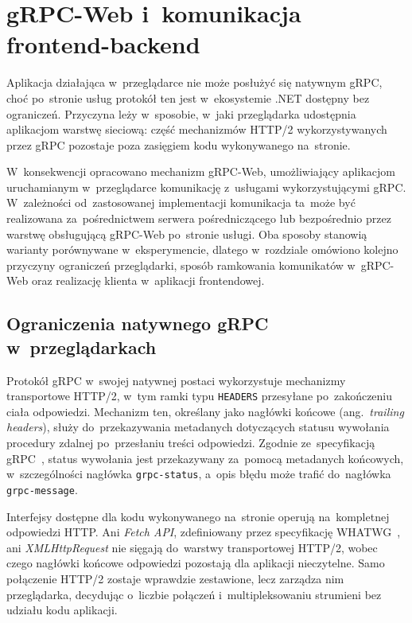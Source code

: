 \cleardoublepage

\chapter{gRPC-Web i~komunikacja frontend-backend}

\label{cha:gRPCWeb}

Aplikacja działająca w~przeglądarce nie może posłużyć się natywnym gRPC, choć po~stronie usług protokół ten jest w~ekosystemie .NET dostępny bez ograniczeń. Przyczyna leży w~sposobie, w~jaki przeglądarka udostępnia aplikacjom warstwę sieciową: część mechanizmów HTTP/2 wykorzystywanych przez gRPC pozostaje poza zasięgiem kodu wykonywanego na~stronie.

W~konsekwencji opracowano mechanizm gRPC-Web, umożliwiający aplikacjom uruchamianym w~przeglądarce komunikację z~usługami wykorzystującymi gRPC. W~zależności od~zastosowanej implementacji komunikacja ta~może być realizowana za~pośrednictwem serwera pośredniczącego lub bezpośrednio przez warstwę obsługującą gRPC-Web po~stronie usługi. Oba sposoby stanowią warianty porównywane w~eksperymencie, dlatego w~rozdziale omówiono kolejno przyczyny ograniczeń przeglądarki, sposób ramkowania komunikatów w~gRPC-Web oraz realizację klienta w~aplikacji frontendowej.


\section{Ograniczenia natywnego gRPC w~przeglądarkach}

\label{sec:OgraniczeniagRPC}


Protokół gRPC w~swojej natywnej postaci wykorzystuje mechanizmy transportowe HTTP/2, w~tym ramki typu \texttt{HEADERS} przesyłane po~zakończeniu ciała odpowiedzi. Mechanizm ten, określany jako nagłówki końcowe (ang.\ \textit{trailing headers}), służy do~przekazywania metadanych dotyczących statusu wywołania procedury zdalnej po~przesłaniu treści odpowiedzi. Zgodnie ze~specyfikacją gRPC~\cite{bib:gRPCDocs}, status wywołania jest przekazywany za~pomocą metadanych końcowych, w~szczególności nagłówka \texttt{grpc-status}, a~opis błędu może trafić do~nagłówka \texttt{grpc-message}.

Interfejsy dostępne dla kodu wykonywanego na~stronie operują na~kompletnej odpowiedzi HTTP. Ani \textit{Fetch API}, zdefiniowany przez specyfikację WHATWG~\cite{bib:FetchAPI}, ani \textit{XMLHttpRequest} nie sięgają do~warstwy transportowej HTTP/2, wobec czego nagłówki końcowe odpowiedzi pozostają dla aplikacji nieczytelne. Samo połączenie HTTP/2 zostaje wprawdzie zestawione, lecz zarządza nim przeglądarka, decydując o~liczbie połączeń i~multipleksowaniu strumieni bez udziału kodu aplikacji.

